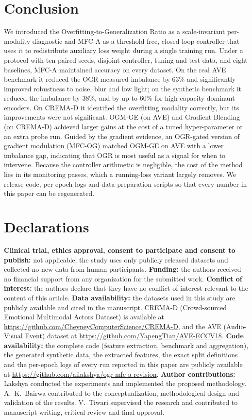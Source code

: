 \documentclass[fleqn,10pt]{wlscirep}
\begin{document}
\section*{Conclusion}
We introduced the Overfitting-to-Generalization Ratio as a scale-invariant per-modality diagnostic and MFC-A as a threshold-free, closed-loop controller that uses it to redistribute auxiliary loss weight during a single training run. Under a protocol with ten paired seeds, disjoint controller, tuning and test data, and eight baselines, MFC-A maintained accuracy on every dataset. On the real AVE benchmark it reduced the OGR-measured imbalance by 63\% and significantly improved robustness to noise, blur and low light; on the synthetic benchmark it reduced the imbalance by 38\%, and by up to 60\% for high-capacity dominant encoders. On CREMA-D it identified the overfitting modality correctly, but its improvements were not significant. OGM-GE (on AVE) and Gradient Blending (on CREMA-D) achieved larger gains at the cost of a tuned hyper-parameter or an extra probe run. Guided by the gradient evidence, an OGR-gated version of gradient modulation (MFC-OG) matched OGM-GE on AVE with a lower imbalance gap, indicating that OGR is most useful as a signal for when to intervene. Because the controller arithmetic is negligible, the cost of the method lies in its monitoring passes, which a running-loss variant largely removes. We release code, per-epoch logs and data-preparation scripts so that every number in this paper can be regenerated.

\section*{Declarations}
\textbf{Clinical trial, ethics approval, consent to participate and consent to publish:} not applicable; the study uses only publicly released datasets and collected no new data from human participants. \textbf{Funding:} the authors received no financial support from any organization for the submitted work. \textbf{Conflict of interest:} the authors declare that they have no conflict of interest relevant to the content of this article. \textbf{Data availability:} the datasets used in this study are publicly available and cited in the manuscript. CREMA-D (Crowd-sourced Emotional Multimodal Actors Dataset)\cite{cao2014crema} is available at \url{https://github.com/CheyneyComputerScience/CREMA-D}, and the AVE (Audio-Visual Event) dataset\cite{tian2018audio} at \url{https://github.com/YapengTian/AVE-ECCV18}. \textbf{Code availability:} the complete code (feature extraction, benchmark and aggregation), the generated synthetic data, the extracted features, the exact split definitions and the per-epoch logs of every run reported in this paper are publicly available at \url{https://github.com/ailakshya/ogr-mfc-a-revision}. \textbf{Author contributions:} Lakshya conducted the experiments and implemented the proposed methodology. A.~K.~Bairwa contributed to the conceptualization, methodological design and validation of the results. V.~Tiwari supervised the research and contributed to manuscript writing, critical review and final approval.


\end{document}
